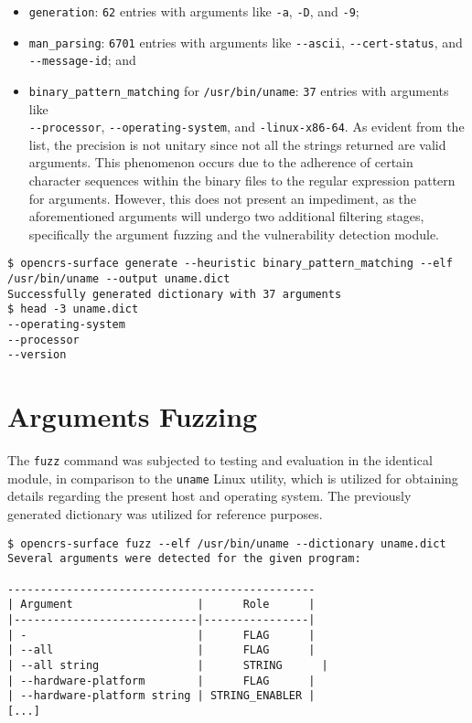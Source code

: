 \documentclass[../main.tex]{subfiles}
\begin{document}
\begin{itemize}
  \tightlist
  \item
        \texttt{generation}: \texttt{62} entries with arguments like
        \texttt{-a}, \texttt{-D}, and \texttt{-9};
  \item
        \texttt{man\_parsing}: \texttt{6701} entries with arguments like
        \texttt{-\/-ascii}, \texttt{-\/-cert-status}, and \\
        \texttt{-\/-message-id}; and
  \item
        \texttt{binary\_pattern\_matching} for \texttt{/usr/bin/uname}:
        \texttt{37} entries with arguments like \\ \texttt{-\/-processor}, \texttt{-\/-operating-system}, and \texttt{-linux-x86-64}. As evident from the
        list, the precision is not unitary since not all the strings
        returned are valid arguments. This phenomenon occurs due to the
        adherence of certain character sequences within the binary files to
        the regular expression pattern for arguments. However, this does not
        present an impediment, as the aforementioned arguments will undergo
        two additional filtering stages, specifically the argument fuzzing and
        the vulnerability detection module.
\end{itemize}

\begin{tiny}
\begin{verbatim}
$ opencrs-surface generate --heuristic binary_pattern_matching --elf /usr/bin/uname --output uname.dict
Successfully generated dictionary with 37 arguments
$ head -3 uname.dict
--operating-system
--processor
--version
\end{verbatim}
\end{tiny}

\hypertarget{arguments-fuzzing}{%
  \section{Arguments Fuzzing}\label{arguments-fuzzing}}

The \texttt{fuzz} command was subjected to testing and evaluation in the
identical module, in comparison to the \texttt{uname} Linux utility, which is
utilized for obtaining details regarding the present host and operating system.
The previously generated dictionary was utilized for reference purposes.

\begin{tiny}
\begin{verbatim}
$ opencrs-surface fuzz --elf /usr/bin/uname --dictionary uname.dict
Several arguments were detected for the given program:

-----------------------------------------------
| Argument                   |      Role      |
|----------------------------|----------------|
| -                          |      FLAG      |
| --all                      |      FLAG      |
| --all string               |      STRING      |
| --hardware-platform        |      FLAG      |
| --hardware-platform string | STRING_ENABLER |
[...]
\end{verbatim}
\end{tiny}
\end{document}
